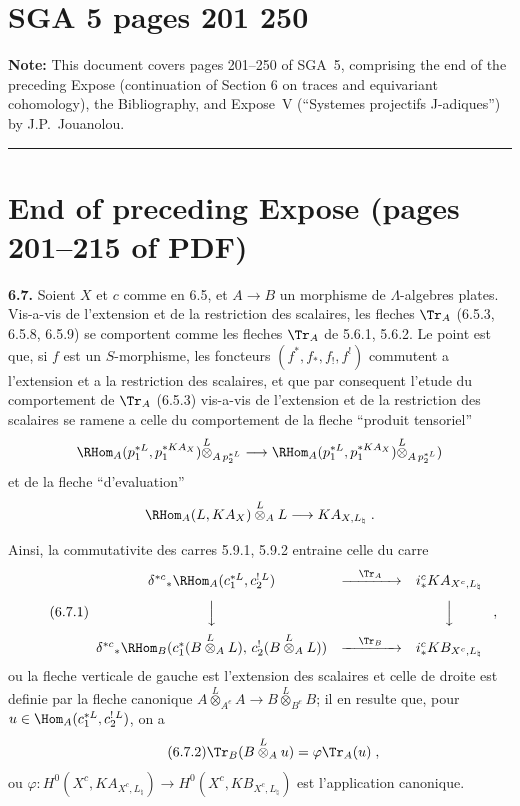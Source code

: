 \clearpage
{}
\section*{SGA 5 pages 201 250}
\setcounter{page}{201}



\noindent\textbf{Note:} This document covers pages 201--250 of SGA~5, comprising the end of the preceding Expose (continuation of Section 6 on traces and equivariant cohomology), the Bibliography, and Expose~V (``Systemes projectifs J-adiques'') by J.P.~Jouanolou.

\bigskip
\hrule
\bigskip

\section*{End of preceding Expose (pages 201--215 of PDF)}

\noindent\textbf{6.7.} Soient $X$ et $c$ comme en 6.5, et $A \longrightarrow B$ un morphisme de $\Lambda$-algebres plates. Vis-a-vis de l'extension et de la restriction des scalaires, les fleches $\Tr_A$ (6.5.3, 6.5.8, 6.5.9) se comportent comme les fleches $\Tr_A$ de 5.6.1, 5.6.2. Le point est que, si $f$ est un $S$-morphisme, les foncteurs $(f^*, f_*, f_!, f^!)$ commutent a l'extension et a la restriction des scalaires, et que par consequent l'etude du comportement de $\Tr_A$ (6.5.3) vis-a-vis de l'extension et de la restriction des scalaires se ramene a celle du comportement de la fleche ``produit tensoriel''
\[
\RHom_A(p_1^{*L}, p_1^{*KA_X}) \overset{L}{\otimes}_{A\,p_2^{*L}} \longrightarrow \RHom_A(p_1^{*L}, p_1^{*KA_X}) \overset{L}{\otimes}_{A\,p_2^{*L}})
\]
et de la fleche ``d'evaluation''
\[
\RHom_A(L, KA_X) \overset{L}{\otimes}_A L \longrightarrow KA_{X,L_\natural}\;.
\]

Ainsi, la commutativite des carres 5.9.1, 5.9.2 entraine celle du carre
\begin{equation}\tag{6.7.1}
\begin{array}{ccc}
\delta^{*c}{}_*\RHom_A(c_1^{*L}, c_2^{!\,L}) & \xrightarrow{\quad\Tr_A\quad} & i_*^c KA_{X^c,L_\natural} \\[8pt]
\Big\downarrow & & \Big\downarrow \\[8pt]
\delta^{*c}{}_*\RHom_B(c_1^{*}(B \overset{L}{\otimes}_A L),\, c_2^{!\,}(B \overset{L}{\otimes}_A L)) & \xrightarrow{\quad\Tr_B\quad} & i_*^c KB_{X^c,L_\natural}
\end{array}\;,
\end{equation}
ou la fleche verticale de gauche est l'extension des scalaires et celle de droite est definie par la fleche canonique $A \overset{L}{\otimes}_{A^e} A \longrightarrow B \overset{L}{\otimes}_{B^e} B$; il en resulte que, pour $u \in \Hom_A(c_1^{*L}, c_2^{!\,L})$, on a
\begin{equation}\tag{6.7.2}
\Tr_B(B \overset{L}{\otimes}_A u) = \varphi\Tr_A(u)\;,
\end{equation}
ou $\varphi : H^0(X^c, KA_{X^c,L_\natural}) \longrightarrow H^0(X^c, KB_{X^c,L_\natural})$ est l'application canonique.

